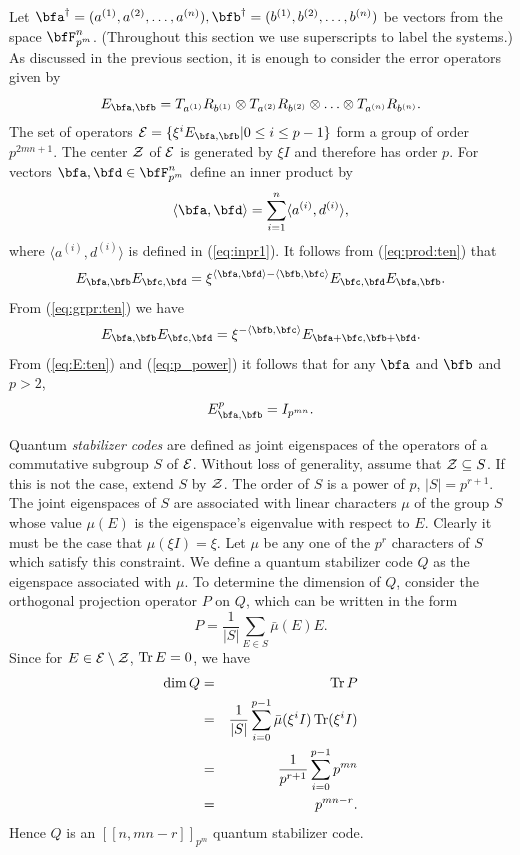 \documentclass{article}
\def\Tr{\qopname\relax{no}{Tr}}
\def\dim{\qopname\relax{no}{dim}}
\begin{document}
Let $\bfa^\dag=(a^{(1)},a^{(2)},\ldots ,a^{(n)})
,\bfb^\dag=(b^{(1)},b^{(2)},\ldots ,b^{(n)})$ be vectors from the
space $\bfF_{p^m}^n$. (Throughout this section we use superscripts to
label the systems.)  As discussed in the previous section, it is
enough to consider the error operators given by
\begin{equation}\label{eq:E:ten}
E_{\bfa,\bfb}=T_{a^{(1)}}R_{b^{(1)}}\otimes T_{a^{(2)}}R_{b^{(2)}}\otimes \ldots
\otimes T_{a^{(n)}}R_{b^{(n)}}.
\end{equation} 
The set of operators ${\cal E} = \{\xi^i E_{\bfa,\bfb}|0\le i\le p-1\}$
form a group of order $p^{2mn+1}$. The center ${\cal Z}$  of ${\cal E}$ is 
generated by $\xi I$ and therefore has order $p$.
For vectors $\bfa, \bfd \in
\bfF_{p^m}^{n}$ define an inner product by
\begin{equation}\label{eq:inpr2}
\langle \bfa, \bfd\rangle=\sum_{i=1}^n \langle a^{(i)},d^{(i)}\rangle,
\end{equation}
where $\langle a^{(i)},d^{(i)}\rangle$ is defined in (\ref{eq:inpr1}). 
It follows from (\ref{eq:prod:ten}) that  
\begin{equation}\label{eq:trans:E}
E_{\bfa,\bfb} E_{\bfc,\bfd}= \xi^{  \langle \bfa, \bfd\rangle-\langle \bfb,\bfc\rangle}
E_{\bfc,\bfd}E_{\bfa,\bfb}.
\end{equation}
From (\ref{eq:grpr:ten}) we have 
\begin{equation}\label{eq:prod:E}
E_{\bfa,\bfb} E_{\bfc,\bfd}= \xi^{ -\langle \bfb,\bfc\rangle}
 E_{\bfa+\bfc, \bfb+\bfd}.
\end{equation}
From (\ref{eq:E:ten}) and (\ref{eq:p_power}) it follows that for any 
$\bfa$ and $\bfb$ and $p>2$,
\begin{equation}\label{eq:E:p_power}
E_{\bfa,\bfb}^p=I_{p^{mn}}.
\end{equation}

Quantum {\em stabilizer codes\/} are defined as joint eigenspaces of
the operators of a commutative subgroup $S$ of ${\cal E}$.  Without
loss of generality, assume that ${\cal Z}\subseteq S$.  If this is not
the case, extend $S$ by ${\cal Z}$.  The order of $S$ is a power of
$p$, $|S|=p^{r+1}$. The joint eigenspaces of $S$ are
associated with linear characters $\mu$ of the group $S$ whose value
$\mu(E)$ is the eigenspace's eigenvalue with respect to $E$. Clearly
it must be the case that $\mu(\xi I)=\xi$.  Let $\mu$ be any one of
the $p^r$ characters of $S$ which satisfy this constraint.
We define a quantum stabilizer code $Q$ as the eigenspace 
associated with $\mu$. To determine the dimension of
$Q$, consider the orthogonal
projection  operator $P$ on $Q$, which can be written  in the form
$$
P=\frac{1}{|S|}\sum_{E\in S}
\bar\mu(E) E. 
$$
Since for $E\in {\cal E}\setminus{\cal Z}$, $\Tr E = 0$, we have
\begin{eqnarray*}
\dim Q &=& \Tr P\\
       &=& \frac{1}{|S|}\sum_{i=0}^{p-1}\bar\mu(\xi^i I)\Tr(\xi^i I)\\
       &=& \frac{1}{p^{r+1}}\sum_{i=0}^{p-1}p^{mn}\\
       &=& p^{mn-r}.
\end{eqnarray*}
Hence $Q$ is an $[[n,mn-r]]_{p^m}$ quantum stabilizer code.
\end{document}
